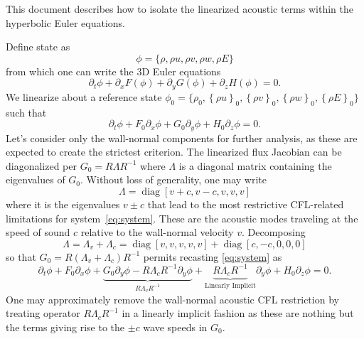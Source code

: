\documentclass[letterpaper,11pt,nointlimits,reqno]{amsart}
\begin{document}
This document describes how to isolate the linearized
acoustic terms within the hyperbolic Euler equations.

Define state as
\begin{equation}
 \phi = \{\rho, \rho u, \rho v, \rho w, \rho E \}
\end{equation}
from which one can write the 3D Euler equations
\begin{equation}
 \partial_t \phi + \partial_x F(\phi) + \partial_y G(\phi) + \partial_z
  H(\phi) = 0
  .
\end{equation}
We linearize about a reference state $\phi_0 = \{\rho_0, \left\{\rho
u\right\}_0, \left\{\rho v\right\}_0, \left\{\rho w\right\}_0, \left\{\rho
E\right\}_0 \}$ such that
\begin{equation}\label{eq:system}
 \partial_t \phi +  F_0 \partial_x \phi + G_0 \partial_y \phi + H_0 \partial_z
  \phi = 0
  .
\end{equation}
Let's consider only the wall-normal components for further analysis, as these
are expected to create the strictest criterion.  The linearized flux Jacobian
can be diagonalized per $G_0 = R \Lambda R^{-1}$ where $\Lambda$ is a diagonal
matrix containing the eigenvalues of $G_0$.  Without loss of generality, one
may write
\begin{equation}
  \Lambda = \operatorname{diag}\left[v+c,v-c,v,v,v\right]
\end{equation}
where it is the eigenvalues $v\pm{}c$ that lead to the most restrictive
CFL-related limitations for system~\eqref{eq:system}.  These are the acoustic
modes traveling at the speed of sound $c$ relative to the wall-normal velocity
$v$.  Decomposing
\begin{equation}\label{eq:eigdecomp}
  \Lambda = \Lambda_v + \Lambda_c =
  \operatorname{diag}\left[v,v,v,v,v\right]
  +
  \operatorname{diag}\left[c,-c,0,0,0\right]
\end{equation}
so that $ G_0 = R \left(\Lambda_v + \Lambda_c\right) R^{-1} $ permits recasting
\eqref{eq:system} as
\begin{equation}
    \partial_t \phi
 +  F_0 \partial_x \phi
 +  \underbrace{
      G_0 \partial_y \phi - R \Lambda_c R^{-1} \partial_y \phi
    }_{R \Lambda_v R^{-1}}
 +  \underbrace{R \Lambda_c R^{-1}}_{\text{Linearly Implicit}} \partial_y \phi
 +  H_0 \partial_z \phi
  = 0
  .
\end{equation}
One may approximately remove the wall-normal acoustic CFL restriction by
treating operator $R \Lambda_c R^{-1}$ in a linearly implicit fashion as these
are nothing but the terms giving rise to the $\pm{}c$ wave speeds in $G_0$.
\end{document}
